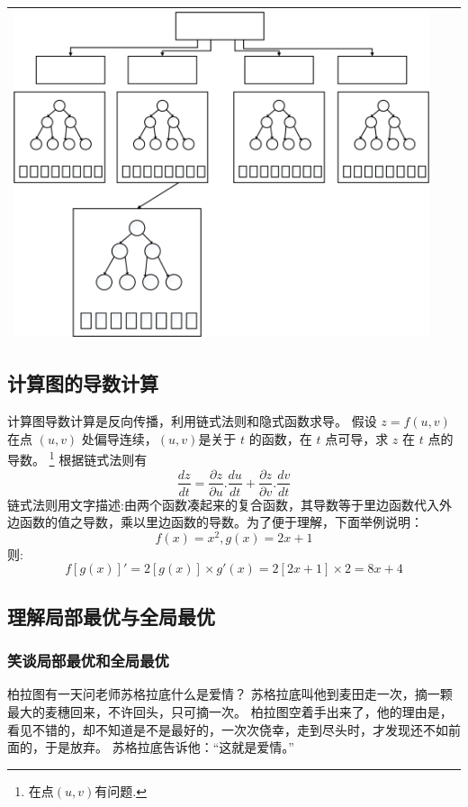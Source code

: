 \begin{longtable}[]{ccc}
\begin{minipage}{0.1\linewidth}
\includegraphics[width=1.0\linewidth]{./img/ch2/2-2-12.png}
\end{minipage}
\tabularnewline
\bottomrule
\end{longtable}


\subsection{计算图的导数计算}
\label{ux8ba1ux7b97ux56feux7684ux5bfcux6570ux8ba1ux7b97}

计算图导数计算是反向传播，利用链式法则和隐式函数求导。
假设 $z = f(u,v)$ 在点 $(u,v)$ 处偏导连续，$(u,v)$是关于 $t$
的函数，在 $t$ 点可导，求 $z$ 在 $t$ 点的导数。
\footnote{在点$(u,v)$有问题.}
根据链式法则有
\[
  \frac{dz}{dt}=\frac{\partial z}{\partial u}.\frac{du}{dt}+
  \frac{\partial z}{\partial v}.\frac{dv}{dt}
\] ​
链式法则用文字描述:由两个函数凑起来的复合函数，其导数等于里边函数代入外边函数的值之导数，乘以里边函数的导数。
​ 为了便于理解，下面举例说明：
\[
f(x)=x^2,g(x)=2x+1
\]
则:
\[
{f[g(x)]}'=2[g(x)] \times g'(x)=2[2x+1] \times 2=8x+4
\]


\subsection{理解局部最优与全局最优}
\label{ux7406ux89e3ux5c40ux90e8ux6700ux4f18ux4e0eux5168ux5c40ux6700ux4f18}
\subsubsection{笑谈局部最优和全局最优}
\label{sec:1.5.1}
柏拉图有一天问老师苏格拉底什么是爱情？
苏格拉底叫他到麦田走一次，摘一颗最大的麦穗回来，不许回头，只可摘一次。
柏拉图空着手出来了，他的理由是，看见不错的，却不知道是不是最好的，一次次侥幸，走到尽头时，才发现还不如前面的，于是放弃。
苏格拉底告诉他：``这就是爱情。''


